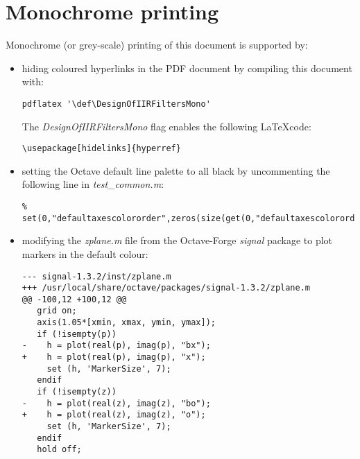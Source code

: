 \documentclass[a4paper,twoside,10pt,english]{report}
\begin{document}
\section*{Monochrome printing}
Monochrome (or grey-scale) printing of this document is supported by:
\begin{itemize}
\item hiding coloured hyperlinks in the PDF document by compiling this 
document with:
\begin{small}
\begin{verbatim}
pdflatex '\def\DesignOfIIRFiltersMono'
\end{verbatim}
\end{small}
The \emph{DesignOfIIRFiltersMono} flag enables the following \LaTeX code:
\begin{small}
\begin{verbatim}
\usepackage[hidelinks]{hyperref} 
\end{verbatim}
\end{small}

\item setting the Octave default line palette to all black by uncommenting the
following line in \emph{test\_common.m}:
\begin{small}
\begin{verbatim}
% set(0,"defaultaxescolororder",zeros(size(get(0,"defaultaxescolororder"))));
\end{verbatim}
\end{small}

\item modifying the \emph{zplane.m} file from the Octave-Forge \emph{signal} 
package to plot markers in the default colour:
\begin{small}
\begin{verbatim}
--- signal-1.3.2/inst/zplane.m
+++ /usr/local/share/octave/packages/signal-1.3.2/zplane.m
@@ -100,12 +100,12 @@
   grid on;
   axis(1.05*[xmin, xmax, ymin, ymax]);
   if (!isempty(p))
-    h = plot(real(p), imag(p), "bx");
+    h = plot(real(p), imag(p), "x");
     set (h, 'MarkerSize', 7);
   endif
   if (!isempty(z))
-    h = plot(real(z), imag(z), "bo");
+    h = plot(real(z), imag(z), "o");
     set (h, 'MarkerSize', 7);
   endif
   hold off;
\end{verbatim}
\end{small}
\end{itemize}

\cleardoublepage
{}
{}


\end{document}
